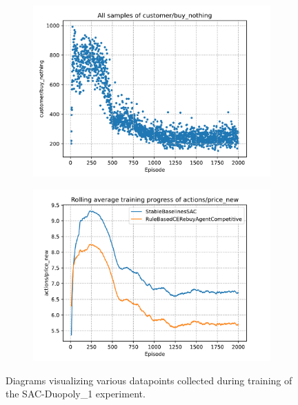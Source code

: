 \begin{figure}[t]
	\begin{subfigure}{0.49\textwidth}
		\centering
		\includegraphics[width = \textwidth]{images/experiments/SACDuopoly/SACDuopolyMixedGraphs3.pdf}\\
		\label{fig:SACDuopolyMixedGraphs3}
	\end{subfigure}
	\begin{subfigure}{0.49\textwidth}
		\centering
		\includegraphics[width = \textwidth]{images/experiments/SACDuopoly/SACDuopolyMixedGraphs4.pdf}\\
		\label{fig:SACDuopolyMixedGraphs4}
	\end{subfigure}
	\caption{Diagrams visualizing various datapoints collected during training of the SAC-Duopoly\_1 experiment.}\label{fig:SACDuopolyMixedGraphs}
\end{figure}

